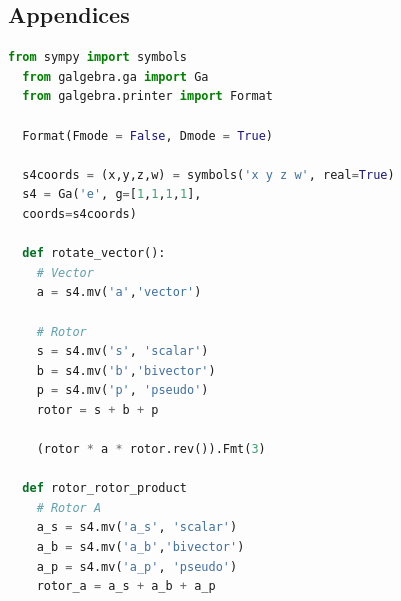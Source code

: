 \documentclass{l4proj}
\begin{document}
%
% 

\begin{appendices}

\chapter{Appendices}


\begin{lstlisting}[language=python, caption={
  Rotor4 product derivation using Geometric Algebra in python: \\
  Rotor4-Vector rotation using double reflection; producing \cref{eq:rotate_vec}.\\
  Rotor4-Rotor4 product to apply a 4D Rotor to another 4D Rotor; producing \cref{eq:rotate_rotor}.
  }, label=lst:rotor_derivation]
  from sympy import symbols
  from galgebra.ga import Ga
  from galgebra.printer import Format
  
  Format(Fmode = False, Dmode = True)
  
  s4coords = (x,y,z,w) = symbols('x y z w', real=True)
  s4 = Ga('e', g=[1,1,1,1],
  coords=s4coords)
  
  def rotate_vector():
    # Vector
    a = s4.mv('a','vector')

    # Rotor
    s = s4.mv('s', 'scalar')
    b = s4.mv('b','bivector')
    p = s4.mv('p', 'pseudo')
    rotor = s + b + p
  
    (rotor * a * rotor.rev()).Fmt(3)
  
  def rotor_rotor_product
    # Rotor A
    a_s = s4.mv('a_s', 'scalar')
    a_b = s4.mv('a_b','bivector')
    a_p = s4.mv('a_p', 'pseudo')
    rotor_a = a_s + a_b + a_p
  

\end{lstlisting}
\end{appendices}
\end{document}
